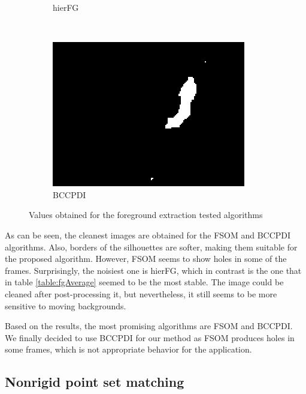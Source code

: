 \begin{figure}
\begin{subfigure}[b]{0.19\textwidth}
                \caption{hierFG}
                \label{fig:cp02_hierFGmask}
        \end{subfigure}%
	~ %
	\begin{subfigure}[b]{0.19\textwidth}
                \centering
                \includegraphics[width=\textwidth]{fig17.jpg}
                \caption{BCCPDI}
                \label{fig:cp02_bccpdiMask}
        \end{subfigure}%

        \caption{Values obtained for the foreground extraction tested algorithms}\label{fig:cp02_fgMasks}
\end{figure}

As can be seen, the cleanest images are obtained for the FSOM and BCCPDI algorithms. Also, borders of the silhouettes 
are softer, making them suitable for the proposed algorithm. However, FSOM seems to show holes in some of the frames. 
Surprisingly, the noisiest one is hierFG, which in contrast is the one that in table \ref{table:fgAverage} seemed to be 
the most stable. The image could be cleaned after post-processing it, but nevertheless, it still seems to be more 
sensitive to moving backgrounds.

Based on the results, the most promising algorithms are FSOM and BCCPDI. We finally decided to use BCCPDI for our method 
as FSOM produces holes in some frames, which is not appropriate behavior for the application.

\subsection{Nonrigid point set matching}\label{ch:chapter02_02_02}

